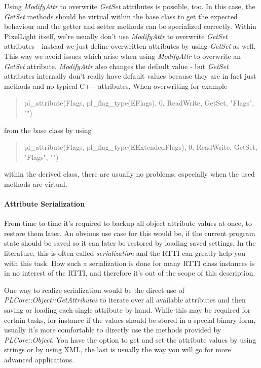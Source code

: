 Using \emph{ModifyAttr} to overwrite \emph{GetSet} attributes is possible, too. In this case, the \emph{GetSet} methods should be virtual within the base class to get the expected behaviour and the getter and setter methods can be specialized correctly. Within PixelLight itself, we're usually don't use \emph{ModifyAttr} to overwrite \emph{GetSet} attributes - instead we just define overwritten attributes by using \emph{GetSet} as well. This way we avoid issues which arise when using \emph{ModifyAttr} to overwrite an \emph{GetSet} attribute. \emph{ModifyAttr} also changes the default value - but \emph{GetSet} attributes internally don't really have default values because they are in fact just methods and no typical C++ attributes. When overwriting for example \begin{quote}pl\_attribute(Flags, pl\_flag\_type(EFlags), 0, ReadWrite, GetSet, "Flags", "")\end{quote} from the base class by using \begin{quote}pl\_attribute(Flags, pl\_flag\_type(EExtendedFlags), 0, ReadWrite, GetSet, "Flags", "") \end{quote} within the derived class, there are usually no problems, especially when the used methods are virtual.


\paragraph{Attribute Serialization}
From time to time it's required to backup all object attribute values at once, to restore them later. An obvious use case for this would be, if the current program state should be saved so it can later be restored by loading saved settings. In the literature, this is often called \emph{serialization} and the \ac{RTTI} can greatly help you with this task. How such a serialization is done for many \ac{RTTI} class instances is in no interest of the \ac{RTTI}, and therefore it's out of the scope of this description.

One way to realize serialization would be the direct use of \emph{PLCore::Object::GetAttributes} to iterate over all available attributes and then saving or loading each single attribute by hand. While this may be required for certain tasks, for instance if the values should be stored in a special binary form, usually it's more comfortable to directly use the methods provided by \emph{PLCore::Object}. You have the option to get and set the attribute values by using strings or by using \ac{XML}, the last is usually the way you will go for more advanced applications.

